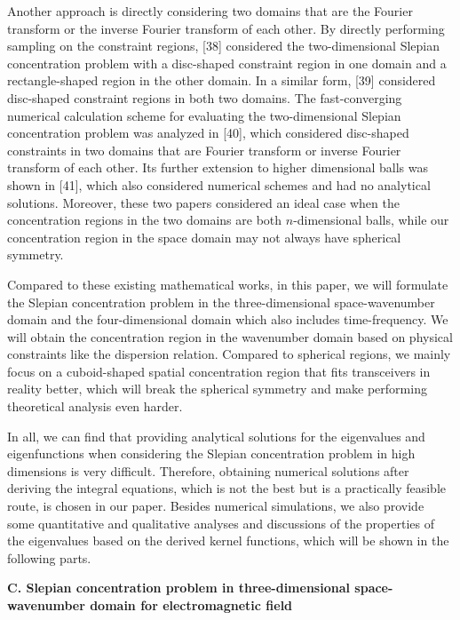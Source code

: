 \documentclass[a4paper,12pt]{article}
\begin{document}
\begin{framed}
{   	\quad Another approach is directly considering two domains that are the Fourier transform or the inverse Fourier transform of each other. By directly performing sampling on the constraint regions, [38] considered the two-dimensional Slepian concentration problem with a disc-shaped constraint region in one domain and a rectangle-shaped region in the other domain. In a similar form, [39] considered disc-shaped constraint regions in both two domains. 
   	The fast-converging numerical calculation scheme for evaluating the two-dimensional Slepian concentration problem was analyzed in [40], which considered disc-shaped constraints in two domains that are Fourier transform or inverse Fourier transform of each other. 
   	Its further extension to higher dimensional balls was shown in [41], which also considered numerical schemes and had no analytical solutions. Moreover, these two papers considered an ideal case when the concentration regions in the two domains are both $n$-dimensional balls, while our concentration region in the space domain may not always have spherical symmetry. 
   	
   	\quad Compared to these existing mathematical works, in this paper, we will formulate the Slepian concentration problem in the three-dimensional space-wavenumber domain and the four-dimensional domain which also includes time-frequency. We will obtain the concentration region in the wavenumber domain based on physical constraints like the dispersion relation. Compared to spherical regions, we mainly focus on a cuboid-shaped spatial concentration region that fits transceivers in reality better, which will break the spherical symmetry and make performing theoretical analysis even harder.  
   	
   	\quad In all, we can find that providing analytical solutions for the eigenvalues and eigenfunctions when considering the Slepian concentration problem in high dimensions is very difficult. Therefore, obtaining numerical solutions after deriving the integral equations, which is not the best but is a practically feasible route, is chosen in our paper. Besides numerical simulations, we also provide some quantitative and qualitative analyses and discussions of the properties of the eigenvalues based on the derived kernel functions, which will be shown in the following parts.
   }
   
   {\bf C. Slepian concentration problem in three-dimensional space-wavenumber domain for electromagnetic field}
   
   {\color{red}
   
}
\end{framed}
\end{document}
